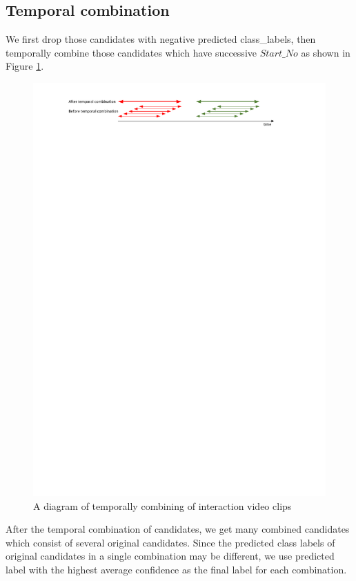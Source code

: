 \subsection{Temporal combination} 
We first drop those candidates with negative predicted class\_labels, then temporally combine those candidates which have successive \(Start\_No\) as shown in Figure \ref{fig:temporal_combination}.
\begin{figure}
	\includegraphics[trim=2cm 27cm 0cm 1cm]{fig01/temporal_combination.pdf}
	\caption{A diagram of temporally combining of interaction video clips }
	\label{fig:temporal_combination}
\end{figure}

After the temporal combination of candidates, we get many combined candidates which consist of several original candidates. Since the predicted class labels of original candidates in a single combination may be different, we use predicted label with the highest average confidence as the final label for each combination.
